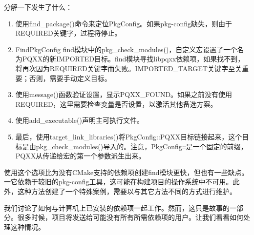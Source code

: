 分解一下发生了什么：

\begin{enumerate}
\item
使用find\_package()命令来定位PkgConfig。如果pkg-config缺失，则由于REQUIRED关键字，过程将停止。

\item
FindPkgConfig find模块中的pkg\_check\_modules()，自定义宏设置了一个名为PQXX的新IMPORTED目标。find模块寻找libpqxx依赖项，如果找不到，将再次因为REQUIRED关键字而失败。IMPORTED\_TARGET关键字至关重要；否则，需要手动定义目标。

\item
使用message()函数验证设置，显示PQXX\_FOUND。如果之前没有使用REQUIRED，这里需要检查变量是否设置，以激活其他备选方案。

\item
使用add\_executable()声明主可执行文件。

\item
最后，使用target\_link\_libraries()将PkgConfig::PQXX目标链接起来，这个目标是由pkg\_check\_modules()导入的。注意，PkgConfig::是一个固定的前缀，PQXX从传递给宏的第一个参数派生出来。
\end{enumerate}

使用这个选项比为没有CMake支持的依赖项创建find模块更快，但也有一些缺点。一它依赖于较旧的pkg-config工具，这可能在构建项目的操作系统中不可用。此外，这种方法创建了一个特殊案例，需要以与其它方法不同的方式进行维护。

我们讨论了如何与计算机上已安装的依赖项一起工作。然而，这只是故事的一部分。很多时候，项目将发送给可能没有所有所需依赖项的用户。让我们看看如何处理这种情况。























